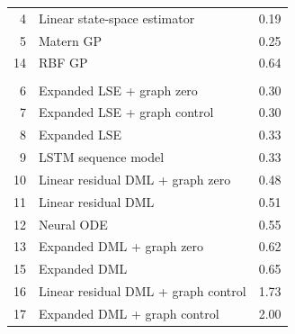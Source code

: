 \begin{tabular}{rlr}
4 & Linear state-space estimator & 0.19 \\
5 & Matern GP & 0.25 \\
14 & RBF GP & 0.64 \\
\addlinespace[2pt]
\multicolumn{3}{l}{\textbf{not retained at \(\delta=0\)}} \\
6 & Expanded LSE + graph zero & 0.30 \\
7 & Expanded LSE + graph control & 0.30 \\
8 & Expanded LSE & 0.33 \\
9 & LSTM sequence model & 0.33 \\
10 & Linear residual DML + graph zero & 0.48 \\
11 & Linear residual DML & 0.51 \\
12 & Neural ODE & 0.55 \\
13 & Expanded DML + graph zero & 0.62 \\
15 & Expanded DML & 0.65 \\
16 & Linear residual DML + graph control & 1.73 \\
17 & Expanded DML + graph control & 2.00 \\
\bottomrule
\end{tabular}
